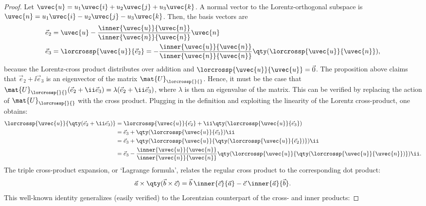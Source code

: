 \begin{proof}
    Let $\uvec{u} = u_1\uvec{i} + u_2\uvec{j} + u_3\uvec{k}$. A normal vector to the Lorentz-orthogonal subspace is $
    \uvec{n} = u_1\uvec{i} - u_2\uvec{j} - u_3\uvec{k}$. Then, the basis vectors are
    \begin{equation}
        \begin{split}
            \vec{e}_2 &= 
            \uvec{u} - \frac{ \inner{\uvec{u}}{\uvec{n}} }{ \inner{\uvec{n}}{\uvec{n}} } \uvec{n} \\
            \vec{e}_3 &= \lorcrossp{\uvec{u}}{\vec{e}_2} = -\frac{ \inner{\uvec{u}}{\uvec{n}} }{ \inner{\uvec{n}}{\uvec{n}} } \qty(\lorcrossp{\uvec{u}}{\uvec{n}}),
        \end{split}
    \end{equation}
    because the Lorentz-cross product distributes over addition and $\lorcrossp{\uvec{u}}{\uvec{u}} = \vec{0}$. The proposition above claims that $\vec{e}_2 + \ii\vec{e}_3$ is an eigenvector of the matrix $\mat{U}_{\lorcrossp{}{}}$. Hence, it must be the case that $\mat{U}_{\lorcrossp{}{}}(\vec{e}_2 + \ii\vec{e}_3) = \lambda(\vec{e}_2 + \ii\vec{e}_3)$, where $\lambda$ is then an eigenvalue of the matrix. This can be verified by replacing the action of $\mat{U}_{\lorcrossp{}{}}$ with the cross product. Plugging in the definition and exploiting the linearity of the Lorentz cross-product, one obtains:
    \begin{equation*}
        \begin{split}
            \lorcrossp{\uvec{u}}{\qty(\vec{e}_2 + \ii\vec{e}_3)} 
            &= \lorcrossp{\uvec{u}}{\vec{e}_2} +
        \ii\qty(\lorcrossp{\uvec{u}}{\vec{e}_3}) \\
            &= \vec{e}_3 + \qty(\lorcrossp{\uvec{u}}{\vec{e}_3})\ii \\ 
            &=\vec{e}_3 +  \qty(\lorcrossp{\uvec{u}}{\qty(\lorcrossp{\uvec{u}}{\vec{e}_2})})\ii \\
            &=\vec{e}_3 -  \frac{ \inner{\uvec{u}}{\uvec{n}} }{ \inner{\uvec{n}}{\uvec{n}} }\qty(\lorcrossp{\uvec{u}}{\qty(\lorcrossp{\uvec{u}}{\uvec{n}})})\ii.  \\
        \end{split}
    \end{equation*}
The triple cross-product expansion, or `Lagrange formula', relates the regular cross product to the corresponding dot product:
    $$ \vec{a}\times\qty(\vec{b}\times\vec{c}) = \vec{b}\:\inner{\vec{c}}{\vec{a}} - \vec{c}\:\inner{\vec{a}}{\vec{b}}. $$
This well-known identity generalizes (easily verified) to the Lorentzian counterpart of the cross- and inner products:

\end{proof}
